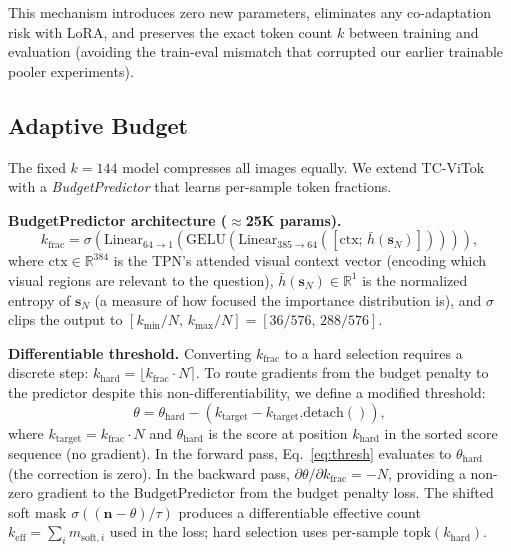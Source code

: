 \documentclass{article}
\newcommand{\sN}{\mathbf{s}_N}
\begin{document}
This mechanism introduces zero new parameters, eliminates any co-adaptation risk with LoRA,
and preserves the exact token count $k$ between training and evaluation (avoiding the
train-eval mismatch that corrupted our earlier trainable pooler experiments).

\subsection{Adaptive Budget}
\label{sec:adaptive}

The fixed $k{=}144$ model compresses all images equally.
We extend TC-ViTok with a \emph{BudgetPredictor} that learns per-sample token fractions.

\textbf{BudgetPredictor architecture ($\approx$25K params).}
\begin{equation}
  k_{\mathrm{frac}} = \sigma\!\left(
    \mathrm{Linear}_{64 \to 1}\!\left(\mathrm{GELU}\!\left(
      \mathrm{Linear}_{385 \to 64}([\mathrm{ctx};\, \bar{h}(\sN)])
    \right)\right)
  \right), \label{eq:bp}
\end{equation}
where $\mathrm{ctx} \in \mathbb{R}^{384}$ is the TPN's attended visual context vector
(encoding which visual regions are relevant to the question),
$\bar{h}(\sN) \in \mathbb{R}^{1}$ is the normalized entropy of $\sN$
(a measure of how focused the importance distribution is),
and $\sigma$ clips the output to $[k_{\min}/N,\, k_{\max}/N] = [36/576,\, 288/576]$.

\textbf{Differentiable threshold.}
Converting $k_{\mathrm{frac}}$ to a hard selection requires a discrete step:
$k_{\mathrm{hard}} = \lfloor k_{\mathrm{frac}} \cdot N \rceil$.
To route gradients from the budget penalty to the predictor despite this
non-differentiability, we define a modified threshold:
\begin{equation}
  \theta = \theta_{\mathrm{hard}}
    - (k_{\mathrm{target}} - k_{\mathrm{target}}.\mathrm{detach}()),
  \label{eq:thresh}
\end{equation}
where $k_{\mathrm{target}} = k_{\mathrm{frac}} \cdot N$ and
$\theta_{\mathrm{hard}}$ is the score at position $k_{\mathrm{hard}}$
in the sorted score sequence (no gradient).
In the forward pass, Eq.~\eqref{eq:thresh} evaluates to $\theta_{\mathrm{hard}}$
(the correction is zero).
In the backward pass, $\partial\theta/\partial k_{\mathrm{frac}} = -N$,
providing a non-zero gradient to the BudgetPredictor from the budget penalty loss.
The shifted soft mask $\sigma((\mathbf{n} - \theta)/\tau)$
produces a differentiable effective count $k_{\mathrm{eff}} = \sum_i m_{\mathrm{soft},i}$
used in the loss; hard selection uses per-sample $\mathrm{topk}(k_{\mathrm{hard}})$.
\end{document}
